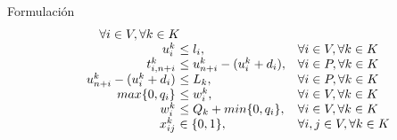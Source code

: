 \documentclass[8pt]{beamer}
\begin{document}
\begin{frame}{Formulación}
\begin{equation*}
\begin{array}{rr@{}ll}
              & \forall i \in V, \forall k \in K \\
            & u_{i}^{k} \ &\leq l_{i},
              & \forall i \in V, \forall k \in K \\
            & t_{i, n + i}^{k} \ &\leq u_{n+i}^{k} - (u_{i}^{k} + d_{i}),
              & \forall i \in P, \forall k \in K \\
            & u_{n+i}^{k} - (u_{i}^{k} + d_{i}) \ &\leq L_{k},
              & \forall i \in P, \forall k \in K \\
            & max\{0, q_{i}\} \ &\leq w_{i}^{k},
              & \forall i \in V, \forall k \in K \\
            & w_{i}^{k} \ &\leq Q_{k} + min\{0, q_{i}\},
              & \forall i \in V, \forall k \in K \\
            & x_{ij}^k \ &\in \{0,1\},
              & \forall i,j \in V, \forall k \in K \\
        \end{array}
      \end{equation*}
  \end{frame}
\end{document}
